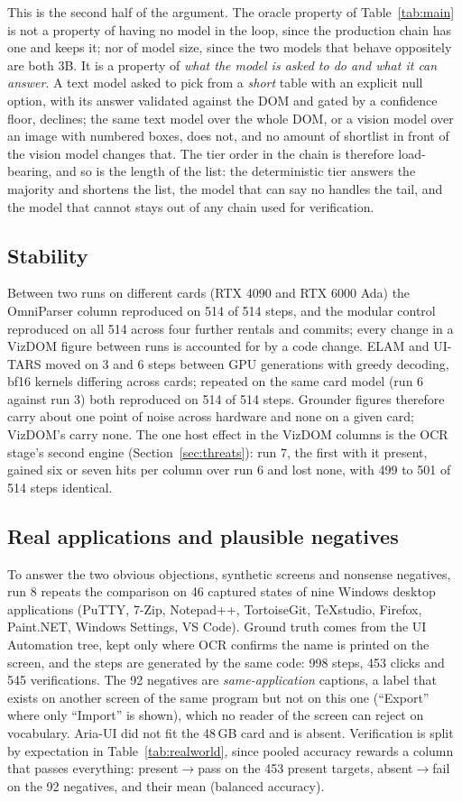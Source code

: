 \documentclass[conference]{IEEEtran}
\begin{document}
This is the second half of the argument. The oracle property of Table~\ref{tab:main} is not a property of having no model in the loop, since the production chain has one and keeps it; nor of model size, since the two models that behave oppositely are both 3B. It is a property of \emph{what the model is asked to do and what it can answer}. A text model asked to pick from a \emph{short} table with an explicit null option, with its answer validated against the DOM and gated by a confidence floor, declines; the same text model over the whole DOM, or a vision model over an image with numbered boxes, does not, and no amount of shortlist in front of the vision model changes that. The tier order in the chain is therefore load-bearing, and so is the length of the list: the deterministic tier answers the majority and shortens the list, the model that can say no handles the tail, and the model that cannot stays out of any chain used for verification.

\subsection{Stability}
Between two runs on different cards (RTX 4090 and RTX 6000 Ada) the OmniParser column reproduced on 514 of 514 steps, and the modular control reproduced on all 514 across four further rentals and commits; every change in a VizDOM figure between runs is accounted for by a code change. ELAM and UI-TARS moved on 3 and 6 steps between GPU generations with greedy decoding, bf16 kernels differing across cards; repeated on the same card model (run 6 against run 3) both reproduced on 514 of 514 steps. Grounder figures therefore carry about one point of noise across hardware and none on a given card; VizDOM's carry none. The one host effect in the VizDOM columns is the OCR stage's second engine (Section~\ref{sec:threats}): run 7, the first with it present, gained six or seven hits per column over run 6 and lost none, with 499 to 501 of 514 steps identical.

\subsection{Real applications and plausible negatives}
\label{sec:realworld}
To answer the two obvious objections, synthetic screens and nonsense negatives, run 8 repeats the comparison on 46 captured states of nine Windows desktop applications (PuTTY, 7-Zip, Notepad++, TortoiseGit, TeXstudio, Firefox, Paint.NET, Windows Settings, VS Code). Ground truth comes from the UI Automation tree, kept only where OCR confirms the name is printed on the screen, and the steps are generated by the same code: 998 steps, 453 clicks and 545 verifications. The 92 negatives are \emph{same-application} captions, a label that exists on another screen of the same program but not on this one (``Export'' where only ``Import'' is shown), which no reader of the screen can reject on vocabulary. Aria-UI did not fit the 48\,GB card and is absent. Verification is split by expectation in Table~\ref{tab:realworld}, since pooled accuracy rewards a column that passes everything: present$\rightarrow$pass on the 453 present targets, absent$\rightarrow$fail on the 92 negatives, and their mean (balanced accuracy).
\end{document}
